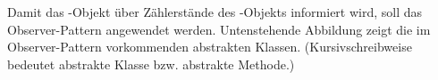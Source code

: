 \documentclass{lehramt-informatik}
\begin{document}
\noindent
Damit das -Objekt über Zählerstände des
-Objekts informiert wird, soll das Observer-Pattern
angewendet werden. Untenstehende Abbildung zeigt die im Observer-Pattern
vorkommenden abstrakten Klassen. (Kursivschreibweise bedeutet abstrakte
Klasse bzw. abstrakte Methode.)

\begin{center}
\end{center}
\end{document}
